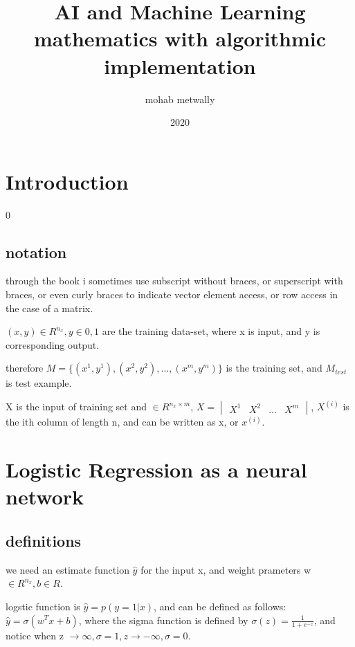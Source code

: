 \documentclass[4apaper,12pt]{book}
\begin{document}
\title{AI and Machine Learning mathematics  with algorithmic implementation}
\author{mohab metwally}
\date{2020}

\maketitle
\tableofcontents

\chapter*{Introduction}
0

\section{notation}
\begin{description}
  \item through the book i sometimes use subscript without braces, or superscript with braces, or even curly braces to indicate vector element access, or row access in the case of a matrix.
\item $(x, y) \in R^{n_x}, y \in {0,1}$ are the training data-set, where x is input,  and y is corresponding output.
\item therefore $M=\{(x^1, y^1), (x^2, y^2), ..., (x^{m}, y^{m})\}$  is the training set, and $M_{test}$ is test example.
\item X is the input of training set and $\in R^{n_x \times m}$, $X=\begin{vmatrix}X^1&X^2&...&X^{m}\end{vmatrix}$, $X^{(i)}$ is the ith column of length n, and can be written as x, or $x^{(i)}$.
\end{description}

\chapter{Logistic Regression as a neural network}

\section{definitions}

\begin{description}
\item we need an estimate function $\hat{y}$ for the input x, and weight prameters w$\in R^{n_x}, b\in R$.
\item logstic function is $\hat{y}=p(y=1|x)$, and can be defined as follows: $\hat{y}=\sigma(w^Tx+b)$, where the sigma function is defined by $\sigma(z)=\frac{1}{1+e^{-z}}$, and notice when z $\to \infty, \sigma = 1, z \to -\infty, \sigma =0$.
\item
\end{description}
\end{document}
